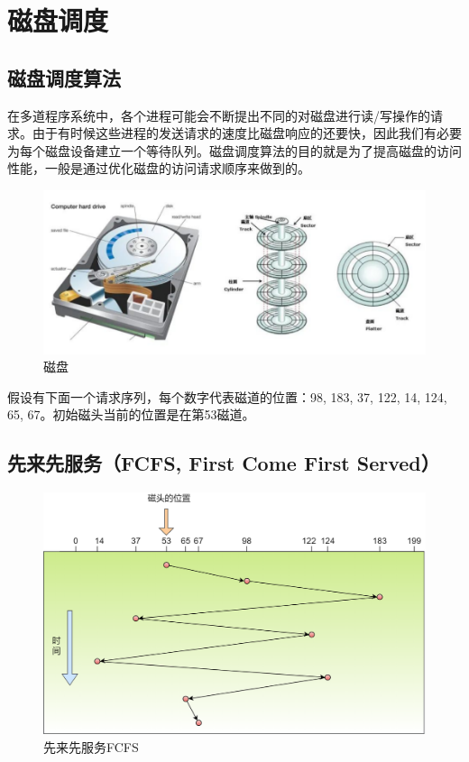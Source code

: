 \newpage

\section{磁盘调度}

\subsection{磁盘调度算法}

在多道程序系统中，各个进程可能会不断提出不同的对磁盘进行读/写操作的请求。由于有时候这些进程的发送请求的速度比磁盘响应的还要快，因此我们有必要为每个磁盘设备建立一个等待队列。磁盘调度算法的目的就是为了提高磁盘的访问性能，一般是通过优化磁盘的访问请求顺序来做到的。

\begin{figure}[H]
	\centering
	\includegraphics[scale=0.95]{img/C4/4-4/1.png}
	\caption{磁盘}
\end{figure}

假设有下面一个请求序列，每个数字代表磁道的位置：98, 183, 37, 122, 14, 124, 65, 67。初始磁头当前的位置是在第53磁道。

\subsection{先来先服务（FCFS, First Come First Served）}

\begin{figure}[H]
	\centering
	\includegraphics[scale=0.3]{img/C4/4-4/2.png}
	\caption{先来先服务FCFS}
\end{figure}


